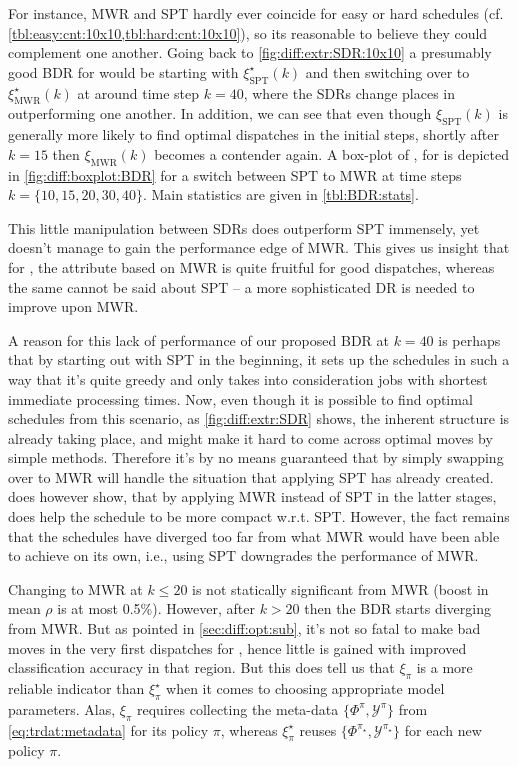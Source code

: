 For instance, MWR and SPT hardly ever coincide for easy or hard schedules (cf. 
\cref{tbl:easy:cnt:10x10,tbl:hard:cnt:10x10}), so its reasonable to believe 
they could complement one another.
Going back to \cref{fig:diff:extr:SDR:10x10} a presumably good BDR for 
  would be starting with $\xi^\star_{\text{SPT}}(k)$ and then 
switching over to $\xi^\star_{\text{MWR}}(k)$ at around time step $k=40$, where 
the SDRs change places in outperforming one another.
In addition, we can see that even though $\xi_{\text{SPT}}(k)$ is generally 
more likely to find optimal dispatches in the initial steps, shortly after 
$k=15$ then $\xi_{\text{MWR}}(k)$ becomes a contender again. 
A box-plot of \namerho, for  is 
depicted in \cref{fig:diff:boxplot:BDR} for a switch between SPT to MWR at time 
steps $k=\{10,15,20,30,40\}$. Main statistics are given in \cref{tbl:BDR:stats}.

This little manipulation between SDRs does outperform SPT immensely, yet 
doesn't manage to gain the performance edge of MWR. 
This gives us insight that for \jsp, the attribute based on MWR is quite 
fruitful for good dispatches, whereas the same cannot be said about SPT -- a 
more sophisticated DR is needed to improve upon MWR. 

A reason for this lack of performance of our proposed BDR at $k=40$ is perhaps 
that by starting out with SPT in the beginning, it sets up the schedules in 
such a way that it's quite greedy and only takes into consideration jobs with 
shortest immediate processing times. 
Now, even though it is possible to find optimal schedules from this scenario, 
as \cref{fig:diff:extr:SDR} shows, the inherent structure is already taking 
place, and might make it hard to come across optimal moves by simple methods. 
Therefore it's by no means guaranteed that by simply swapping over to MWR will 
handle the situation that applying SPT has already created. 
 does however show, that by applying MWR instead of 
SPT in the latter stages, does help the schedule to be more compact w.r.t. SPT. 
However, the fact remains that the schedules have diverged too far from what 
MWR would have been able to achieve on its own, i.e., using SPT downgrades the 
performance of MWR. 

Changing to MWR at $k\leq20$ is not statically significant from MWR (boost in 
mean $\rho$ is at most 0.5\%). 
However, after $k>20$ then the BDR starts diverging from MWR. 
But as pointed in \cref{sec:diff:opt:sub}, it's not so fatal to make bad moves 
in the very first dispatches for , hence little is gained with 
improved classification accuracy in that region. 
But this does tell us that $\xi_\pi$ is a more reliable indicator than 
$\xi^\star_\pi$ when it comes to choosing appropriate model parameters. 
Alas, $\xi_\pi$ requires collecting the meta-data 
$\{\Phi^\pi,\mathcal{Y}^\pi\}$ from \cref{eq:trdat:metadata} for its policy 
$\pi$, whereas $\xi^\star_\pi$ reuses 
$\{\Phi^{\pi_\star},\mathcal{Y}^{\pi_\star}\}$ 
for each new policy $\pi$.

